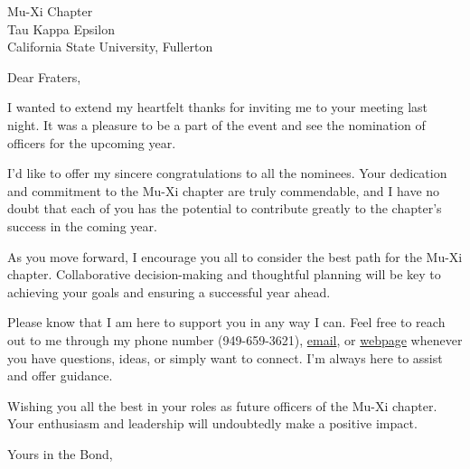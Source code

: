 \documentclass[11pt,letterpaper]{letter}
\begin{document}
 
\begin{letter}{Mu-Xi Chapter \\ Tau Kappa Epsilon \\ California State University, Fullerton \\}
\opening{Dear Fraters,} 


I wanted to extend my heartfelt thanks for inviting me to your meeting last night. It was a pleasure to be a part of the event and see the nomination of officers for the upcoming year.

I'd like to offer my sincere congratulations to all the nominees. Your dedication and commitment to the Mu-Xi chapter are truly commendable, and I have no doubt that each of you has the potential to contribute greatly to the chapter's success in the coming year.

As you move forward, I encourage you all to consider the best path for the Mu-Xi chapter. Collaborative decision-making and thoughtful planning will be key to achieving your goals and ensuring a successful year ahead.

Please know that I am here to support you in any way I can. Feel free to reach out to me through my phone number (949-659-3621), \href{mailto:dpadams@fullerton.edu}{email}, or \href{https://dadams.io}{webpage} whenever you have questions, ideas, or simply want to connect. I'm always here to assist and offer guidance.

Wishing you all the best in your roles as future officers of the Mu-Xi chapter. Your enthusiasm and leadership will undoubtedly make a positive impact.

\closing{Yours in the Bond,}
\end{letter} 
\end{document}
